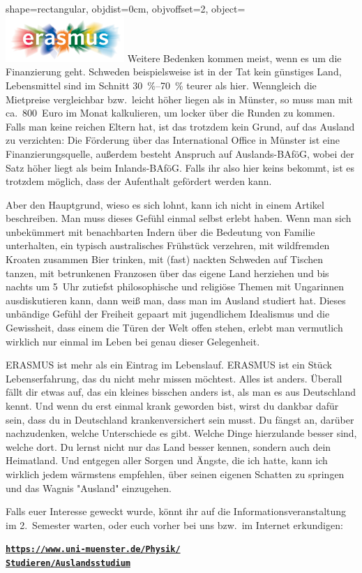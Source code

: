 \begin{pullquote}{shape=rectangular, objdist=0cm, objvoffset=2,
object={\includegraphics[width=4.5cm]{res/erasmus.jpg}}}
Weitere Bedenken kommen meist, wenn es um die Finanzierung geht. Schweden beispielsweise ist in der Tat kein günstiges Land, Lebensmittel sind im Schnitt \SIrange{30}{70}{\percent} teurer als hier. Wenngleich die Mietpreise vergleichbar bzw.\ leicht höher liegen als in Münster, so muss man mit ca.~800~Euro im Monat kalkulieren, um locker über die Runden zu kommen. Falls man keine reichen Eltern hat, ist das trotzdem kein Grund, auf das Ausland zu verzichten: Die Förderung über das International Office in Münster ist eine Finanzierungsquelle, außerdem besteht Anspruch auf Auslands-BAföG, wobei der Satz höher liegt als beim Inlands-BAföG. Falls ihr also hier keins bekommt, ist es trotzdem möglich, dass der Aufenthalt gefördert werden kann.\pullquotenl

Aber den Hauptgrund, wieso es sich lohnt, kann ich nicht in einem Artikel beschreiben. Man muss dieses Gefühl einmal selbst erlebt haben. Wenn man sich unbekümmert mit benachbarten Indern über die Bedeutung von Familie unterhalten, ein typisch australisches Frühstück verzehren, mit wildfremden Kroaten zusammen Bier trinken, mit (fast) nackten Schweden auf Tischen tanzen, mit betrunkenen Franzosen über das eigene Land herziehen und bis nachts um 5~Uhr zutiefst philosophische und religiöse Themen mit Ungarinnen ausdiskutieren kann, dann weiß man, dass man im Ausland studiert hat. Dieses unbändige Gefühl der Freiheit gepaart mit jugendlichem Idealismus und die Gewissheit, dass einem die Türen der Welt offen stehen, erlebt man vermutlich wirklich nur einmal im Leben bei genau dieser Gelegenheit.\pullquotenl

ERASMUS ist mehr als ein Eintrag im Lebenslauf. ERASMUS ist ein Stück Lebenserfahrung, das du nicht mehr missen möchtest. Alles ist anders. Überall fällt dir etwas auf, das ein kleines bisschen anders ist, als man es aus Deutschland kennt. Und wenn du erst einmal krank geworden bist, wirst du dankbar dafür sein, dass du in Deutschland krankenversichert sein musst. Du fängst an, darüber nachzudenken, welche Unterschiede es gibt. Welche Dinge hierzulande besser sind, welche dort. Du lernst nicht nur das Land besser kennen, sondern auch dein Heimatland. Und entgegen aller Sorgen und Ängste, die ich hatte, kann ich wirklich jedem wärmstens empfehlen, über seinen eigenen Schatten zu springen und das Wagnis "Ausland" einzugehen.\pullquotenl

Falls euer Interesse geweckt wurde, könnt ihr auf die Informationsveranstaltung im 2.~Semester warten, oder euch vorher bei uns bzw.\ im Internet erkundigen:

\href{https://www.uni-muenster.de/Physik/Studieren/Auslandsstudium}{\textbf{\texttt{https://www.uni-muenster.de/Physik/\\Studieren/Auslandsstudium}}}

\end{pullquote}
